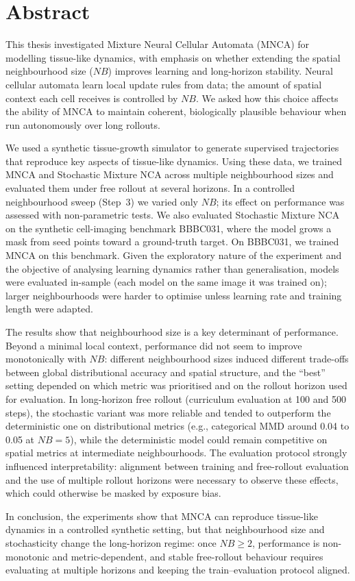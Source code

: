 \chapter*{Abstract}

This thesis investigated Mixture Neural Cellular Automata (MNCA) for modelling tissue-like dynamics, with emphasis on whether extending the spatial neighbourhood size (\(NB\)) improves learning and long-horizon stability. Neural cellular automata learn local update rules from data; the amount of spatial context each cell receives is controlled by \(NB\). We asked how this choice affects the ability of MNCA to maintain coherent, biologically plausible behaviour when run autonomously over long rollouts.

We used a synthetic tissue-growth simulator to generate supervised trajectories that reproduce key aspects of tissue-like dynamics. Using these data, we trained MNCA and Stochastic Mixture NCA across multiple neighbourhood sizes and evaluated them under free rollout at several horizons. In a controlled neighbourhood sweep (Step~3) we varied only \(NB\); its effect on performance was assessed with non-parametric tests. We also evaluated Stochastic Mixture NCA on the synthetic cell-imaging benchmark BBBC031, where the model grows a mask from seed points toward a ground-truth target. On BBBC031, we trained MNCA on this benchmark. Given the exploratory nature of the experiment and the objective of analysing learning dynamics rather than generalisation, models were evaluated in-sample (each model on the same image it was trained on); larger neighbourhoods were harder to optimise unless learning rate and training length were adapted.

The results show that neighbourhood size is a key determinant of performance. Beyond a minimal local context, performance did not seem to improve monotonically with \(NB\): different neighbourhood sizes induced different trade-offs between global distributional accuracy and spatial structure, and the ``best'' setting depended on which metric was prioritised and on the rollout horizon used for evaluation. In long-horizon free rollout (curriculum evaluation at 100 and 500 steps), the stochastic variant was more reliable and tended to outperform the deterministic one on distributional metrics (e.g., categorical MMD around 0.04 to 0.05 at \(NB=5\)), while the deterministic model could remain competitive on spatial metrics at intermediate neighbourhoods. The evaluation protocol strongly influenced interpretability: alignment between training and free-rollout evaluation and the use of multiple rollout horizons were necessary to observe these effects, which could otherwise be masked by exposure bias.

In conclusion, the experiments show that MNCA can reproduce tissue-like dynamics in a controlled synthetic setting, but that neighbourhood size and stochasticity change the long-horizon regime: once \(NB\ge2\), performance is non-monotonic and metric-dependent, and stable free-rollout behaviour requires evaluating at multiple horizons and keeping the train--evaluation protocol aligned.

\thispagestyle{empty}
\mbox{}
\newpage
